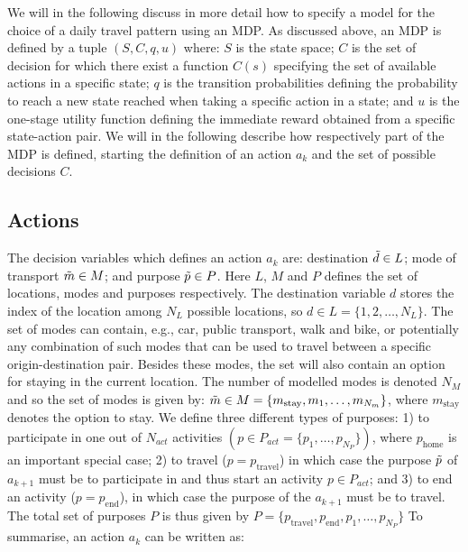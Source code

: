 \newcommand{\s}[1]{s_{#1}}
We will in the following discuss in more detail how to specify a model for the choice of a daily travel pattern using an MDP. As discussed above, an MDP is defined by a tuple $(S,C,q,u)$ where: $S$ is the state space; $C$ is the set of decision for which there exist a function $C(s)$ specifying the set of available actions in a specific state; $q$ is the transition probabilities defining the probability to reach a new state reached when taking a specific action in a state; and $u$ is the one-stage utility function defining the immediate reward obtained from a specific state-action pair. We will in the following describe how respectively part of the MDP is defined, starting the definition of an action $a_k$ and the set of possible decisions $C$.
\subsection{Actions}
The decision variables which defines an action $a_k$ are: destination $\tilde{d} \in L$; mode of transport $\tilde{m} \in M$; and purpose $\tilde{p} \in P$. Here $L$, $M$ and $P$ defines the set of locations, modes and purposes respectively.  The destination variable $d$ stores the index of the location among $N_L$ possible locations, so $d \in  L = \{1,2,\dots, N_L\}$. The set of modes can contain, e.g., car, public transport, walk and bike, or potentially any combination of such modes that can be used to travel between a specific origin-destination pair. Besides these modes, the set will also contain an option for staying in the current location. The number of modelled modes is denoted $N_M$ and so the set of modes is given by: $\tilde{m} \in M = \{m_{\text{stay}},m_1,\dots,m_{N_m}\}$, where $m_{\text{stay}}$ denotes the option to stay. We define three different types of purposes: 1) to participate in one out of $N_{act}$ activities $(p\in P_{act} = \{p_1,\dots,p_{N_P}\})$, where $p_\text{home}$ is an important special case; 2) to travel ($p=p_{\text{travel}}$) in which case the purpose $\tilde{p}$ of $a_{k+1}$ must be to participate in and thus start an activity $p \in P_{act}$; and 3) to end an activity ($p=p_{\text{end}}$), in which case the purpose of the $a_{k+1}$ must be to travel. The total set of purposes $P$ is thus given by $P = \{p_{\text{travel}},p_{\text{end}},p_1,\dots,p_{N_P}\}$
To summarise, an action $a_k$ can be written as: 
